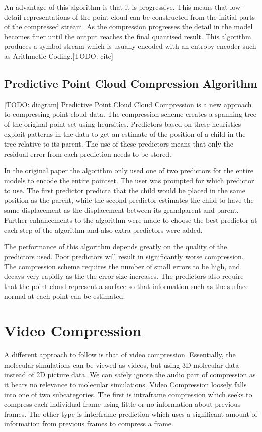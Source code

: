 \documentclass[a4paper,11pt]{report}
\begin{document}
An advantage of this algorithm is that it is progressive. This means that low-detail representations of the point cloud can be constructed from the initial parts of the compressed stream. As the compression progresses the detail in the model becomes finer until the output reaches the final quantised result. This algorithm produces a symbol stream which is usually encoded with an entropy encoder such as Arithmetic Coding.[TODO: cite]

\subsection{Predictive Point Cloud Compression Algorithm}

[TODO: diagram]
Predictive Point Cloud Cloud Compression is a new approach to compressing point cloud data. The compression scheme creates a spanning tree of the original point set using heursitics.\cite{gumholdcomp} Predictors based on these heuristics exploit patterns in the data to get an estimate of the position of a child in the tree relative to its parent. The use of these predictors means that only the residual error from each prediction needs to be stored.

In the original paper the algorithm only used one of two predictors for the entire models to encode the entire pointset. The user was prompted for which predictor to use. The first predictor predicta that the child would be placed in the same position as the parent, while the second predictor estimates the child to have the same displacement as the displacement between its grandparent and parent. Further enhancements to the algorithm were made to choose the best predictor at each step of the algorithm and also extra predictors were added.\cite{merrycomp}

The performance of this algorithm depends greatly on the quality of the predictors used. Poor predictors will result in significantly worse compression. The compression scheme requires the number of small errors to be high, and decays very rapidly as the the error size increases. The predictors also require that the point cloud represent a surface so that information such as the surface normal at each point can be estimated.

\section{Video Compression}

A different approach to follow is that of video compression. Essentially, the molecular simulations can be viewed as videos, but using 3D molecular data instead of 2D picture data. We can safely ignore the audio part of compression as it bears no relevance to molecular simulations. Video Compression loosely falls into one of two subcategories. The first is intraframe compression which seeks to compress each individual frame using little or no information about previous frames. The other type is interframe prediction which uses a significant amount of information from previous frames to compress a frame. 
\end{document}
